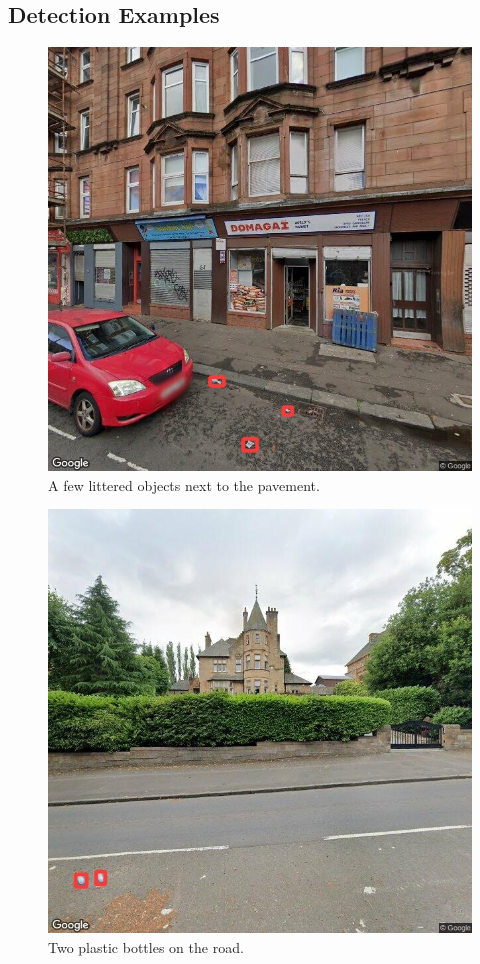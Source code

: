 \documentclass{thesis}
\begin{document}
\begin{appendices}

\chapter{Detection Examples}

\begin{figure}[h]
    \centering
    \includegraphics[scale=0.45]{images/good-three.jpg}
    \caption{A few littered objects next to the pavement.}
\end{figure}

\begin{figure}[h]
    \centering
    \includegraphics[scale=0.45]{images/good-two-bottles.jpg}
    \caption{Two plastic bottles on the road.}
\end{figure}


\end{appendices}
\end{document}

